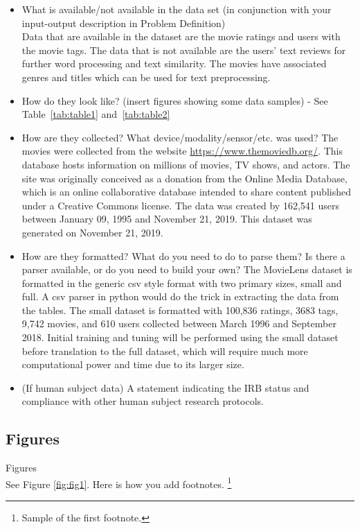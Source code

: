 \documentclass{article}
\begin{document}
\begin{itemize}
\item What is available/not available in the data set (in conjunction with your input-output description in Problem Definition) \\
Data that are available in the dataset are the movie ratings and users with the movie tags. The data that is not available are the users' text reviews for further
word processing and text similarity. The movies have associated genres and titles which can be used for text preprocessing.
\item How do they look like? (insert figures showing some data samples) - See Table~\ref{tab:table1} and~\ref{tab:table2}
\item How are they collected? What device/modality/sensor/etc. was used?
The movies were collected from the website \url{https://www.themoviedb.org/}. This database hosts information on millions of movies, TV shows, and actors. The site was originally conceived as a donation from the Online Media Database, which is an online collaborative database intended to share content published under a Creative Commons license. The data was created by 162,541 users between January 09, 1995 and November 21, 2019. This dataset was generated on November 21, 2019.
\item How are they formatted? What do you need to do to parse them? Is there a parser available, or do you need to build your own?
The MovieLens dataset is formatted in the generic csv style format with two primary sizes, small and full. A csv parser in python would do the trick in extracting the data from the tables. The small dataset is formatted with 100,836 ratings, 3683 tags, 9,742 movies, and 610 users collected between March 1996 and September 2018. Initial training and tuning will be performed using the small dataset before translation to the full dataset, which will require much more computational power and time due to its larger size. 
\item (If human subject data) A statement indicating the IRB status and compliance with other human subject research protocols.
\end{itemize}

\subsection{Figures}
Figures \\
See Figure \ref{fig:fig1}. Here is how you add footnotes. \footnote{Sample of the first footnote.}
\end{document}

